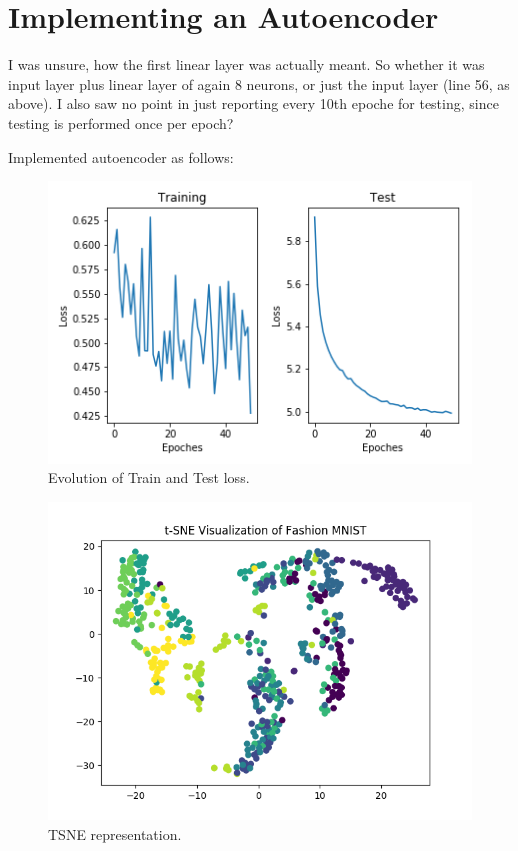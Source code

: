 \documentclass[11pt,a4paper,oneside]{article}
\begin{document}
\section{Implementing an Autoencoder}
I was unsure, how the first linear layer was actually meant. So whether it was input layer plus linear layer of again 8 neurons, or just the input layer (line 56, as above).
I also saw no point in just reporting every 10th epoche for testing, since testing is performed once per epoch?

Implemented autoencoder as follows:


\begin{figure}
	\centering
	\includegraphics[width=.9\textwidth]{figures/auto_encoder_evolution}
	\caption{Evolution of Train and Test loss.}
\end{figure}
\begin{figure}[!btp]
	\centering
	\includegraphics[width=.9\textwidth]{figures/t_sne}
	\caption{TSNE representation.}
\end{figure}
\end{document}
